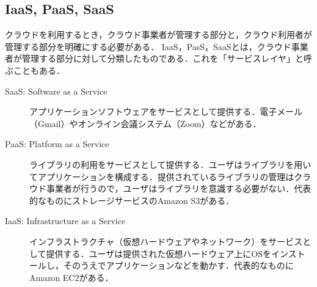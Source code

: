 \subsection{IaaS, PaaS, SaaS}
クラウドを利用するとき，クラウド事業者が管理する部分と，クラウド利用者が管理する部分を明確にする必要がある．
IaaS，PasS，SaaSとは，クラウド事業者が管理する部分に対して分類したものである．これを「サービスレイヤ」と呼ぶこともある．
\begin{description}
    \item[SaaS: Software as a Service] アプリケーションソフトウェアをサービスとして提供する．電子メール（Gmail）やオンライン会議システム（Zoom）などがある．
    \item[PaaS: Platform as a Service] ライブラリの利用をサービスとして提供する．ユーザはライブラリを用いてアプリケーションを構成する．提供されているライブラリの管理はクラウド事業者が行うので，ユーザはライブラリを意識する必要がない．代表的なものにストレージサービスのAmazon S3がある．
    \item[IaaS: Infrastructure as a Service] インフラストラクチャ（仮想ハードウェアやネットワーク）をサービスとして提供する．ユーザは提供された仮想ハードウェア上にOSをインストールし，そのうえでアプリケーションなどを動かす．代表的なものにAmazon EC2がある．
\end{description}
\begin{flushright}
    \cite[p.164]{オペレーティングシステム}
\end{flushright}
